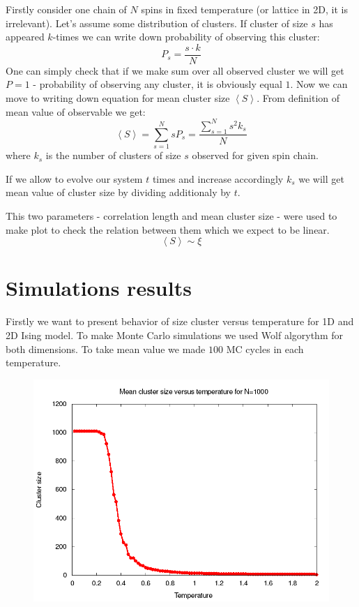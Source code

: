 \documentclass[a4paper,12pt,titlepage]{article}
\begin{document}
  Firstly consider one chain of $N$ spins in fixed temperature (or lattice in 2D, it is irrelevant). Let's assume some distribution
  of clusters. If cluster of size $s$ has appeared $k$-times we can write down probability of observing this cluster:
  \begin{displaymath}
   P_s=\frac{s \cdot k}{N}
  \end{displaymath}
  One can simply check that if we make sum over all observed cluster we will get $P=1$ - probability of observing any cluster, it is
  obviously equal $1$. Now we can move to writing down equation for mean cluster size $\left<S\right>$. From definition of mean value of observable we get:
  \begin{displaymath}
   \left< S\right> = \sum_{s=1}^{N}sP_s=\frac{\sum_{s=1}^{N}{s^2k_s}}{N}
  \end{displaymath}
  where $k_s$ is the number of clusters of size $s$ observed for given spin chain.
  
  If we allow to evolve our system $t$ times and increase accordingly $k_s$ we will get mean value of cluster size by dividing additionaly
  by $t$.
  
  This two parameters - correlation length and mean cluster size - were used to make plot to check the relation between them which we
  expect to be linear.
  \begin{displaymath}
   \left< S \right> \sim \xi
  \end{displaymath}

  \section{Simulations results}
  Firstly we want to present behavior of size cluster versus temperature for 1D and 2D Ising model. To make Monte Carlo simulations
  we used Wolf algorythm for both dimensions. To take mean value we made $100$ MC cycles in each temperature.
  
  \begin{figure}[h]
    \centering
    \includegraphics[scale=0.5]{plots/IsingTestMeanClusterFreq1D.png}
  \end{figure}
  
\end{document}
